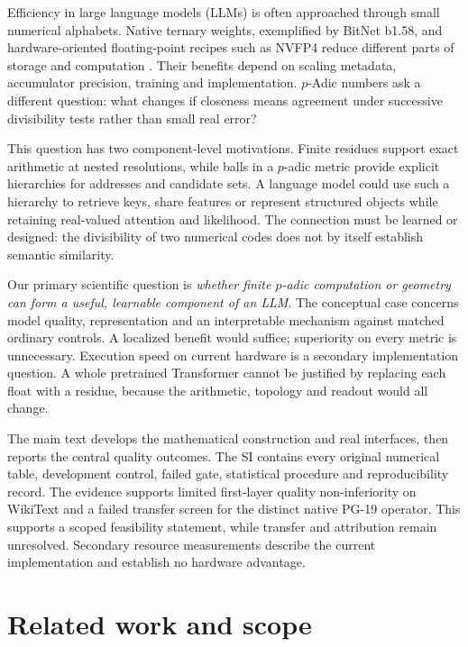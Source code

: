 \documentclass[11pt]{article}
\begin{document}
Efficiency in large language models (LLMs) is often approached through small numerical alphabets.
Native ternary weights, exemplified by BitNet b1.58, and hardware-oriented
floating-point recipes such as NVFP4 reduce different parts of storage and
computation \citep{ma2024era,ma2025bitnet,nvidia2026nvfp4}. Their benefits depend
on scaling metadata, accumulator precision, training and implementation.
\(p\)-Adic numbers ask a different question: what changes if closeness means
agreement under successive divisibility tests rather than small real error?

This question has two component-level motivations. Finite residues support
exact arithmetic at nested resolutions, while balls in a \(p\)-adic metric
provide explicit hierarchies for addresses and candidate sets. A language
model could use such a hierarchy to retrieve keys, share features or represent
structured objects while retaining real-valued attention and likelihood.
The connection must be learned or designed: the divisibility of two numerical
codes does not by itself establish semantic similarity.

Our primary scientific question is \emph{whether finite \(p\)-adic computation
or geometry can form a useful, learnable component of an LLM}. The conceptual
case concerns model quality, representation and an interpretable mechanism
against matched ordinary controls. A localized benefit would suffice;
superiority on every metric is unnecessary. Execution speed on current
hardware is a secondary implementation question. A whole pretrained Transformer
cannot be justified by replacing each float with a residue, because the
arithmetic, topology and readout would all change.

The main text develops the mathematical construction and real interfaces,
then reports the central quality outcomes. The SI contains every original
numerical table, development control, failed gate, statistical procedure and
reproducibility record. The evidence supports limited first-layer quality
non-inferiority on WikiText and a failed transfer screen for the distinct
native PG-19 operator. This supports a scoped feasibility statement, while
transfer and attribution remain unresolved. Secondary resource measurements
describe the current implementation and establish no hardware advantage.

\section{Related work and scope}
\end{document}
